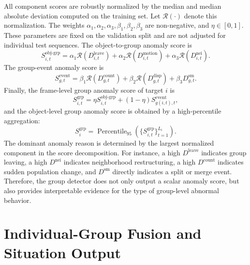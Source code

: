 All component scores are robustly normalized by the median and median absolute deviation computed on the training set. Let \(\mathcal{R}(\cdot)\) denote this normalization. The weights \(\alpha_1,\alpha_2,\alpha_3,\beta_1,\beta_2,\beta_3\) are non-negative, and \(\eta\in[0,1]\). These parameters are fixed on the validation split and are not adjusted for individual test sequences. The object-to-group anomaly score is
\begin{equation}
  S_{i,t}^{\mathrm{obj\mbox{-}grp}}
  =
  \alpha_1\mathcal{R}(D_{i,t}^{\mathrm{leave}})
  +
  \alpha_2\mathcal{R}(D_{i,t}^{\mathrm{motion}})
  +
  \alpha_3\mathcal{R}(D_{i,t}^{\mathrm{nei}}).
\end{equation}
The group-event anomaly score is
\begin{equation}
  S_{g,t}^{\mathrm{event}}
  =
  \beta_1\mathcal{R}(D_{g,t}^{\mathrm{count}})
  +
  \beta_2\mathcal{R}(D_{g,t}^{\mathrm{disp}})
  +
  \beta_3D_{g,t}^{\mathrm{sm}}.
\end{equation}
Finally, the frame-level group anomaly score of target \(i\) is
\begin{equation}
  S_{i,t}^{\mathrm{grp}}
  =
  \eta S_{i,t}^{\mathrm{obj\mbox{-}grp}}
  +
  (1-\eta)S_{g(i,t),t}^{\mathrm{event}},
\end{equation}
and the object-level group anomaly score is obtained by a high-percentile aggregation:
\begin{equation}
  S_{i}^{\mathrm{grp}}
  =
  \operatorname{Percentile}_{95}
  \left(\{S_{i,t}^{\mathrm{grp}}\}_{t=1}^{L_i}\right).
\end{equation}
The dominant anomaly reason is determined by the largest normalized component in the score decomposition. For instance, a high \(D^{\mathrm{leave}}\) indicates group leaving, a high \(D^{\mathrm{nei}}\) indicates neighborhood restructuring, a high \(D^{\mathrm{count}}\) indicates sudden population change, and \(D^{\mathrm{sm}}\) directly indicates a split or merge event. Therefore, the group detector does not only output a scalar anomaly score, but also provides interpretable evidence for the type of group-level abnormal behavior.

\section{Individual-Group Fusion and Situation Output}


